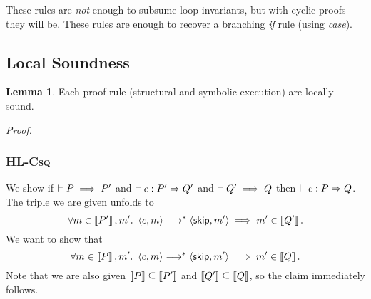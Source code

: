 \documentclass[10pt]{article}
\theoremstyle{definition}
\newtheorem{lemma}{Lemma}
\begin{document}



\noindent
These rules are \emph{not} enough to subsume loop invariants, but with cyclic proofs they will be.
These rules are enough to recover a branching \emph{if} rule (using \emph{case}).



\subsection*{Local Soundness}


\begin{lemma}
    Each proof rule (structural and symbolic execution) are locally sound.
\end{lemma}

\noindent
\emph{Proof.}

\subsubsection*{\textsc{HL-Csq}}
We show if $\vDash P \implies P'$ and 
      $\VAL \Triple c : P' => Q'$ and 
      $\vDash Q' \implies Q$
then $\VAL \Triple c : P => Q$.
The triple we are given unfolds to
\[
    \forall m \in \Interp{P'}, m'.\
    \Cfg(c, m) \sstepstotrans \Cfg(\Skip, m')
    \implies m' \in \Interp{Q'}.
\]
We want to show that
\[
    \forall m \in \Interp P, m'.\
    \Cfg(c, m) \sstepstotrans \Cfg(\Skip, m')
    \implies m' \in \Interp Q.
\]
Note that we are also given $\left\llbracket P \right\rrbracket \subseteq \left\llbracket P' \right\rrbracket$ and $\left\llbracket Q' \right\rrbracket \subseteq \left\llbracket Q \right\rrbracket$,
so the claim immediately follows.
\end{document}
